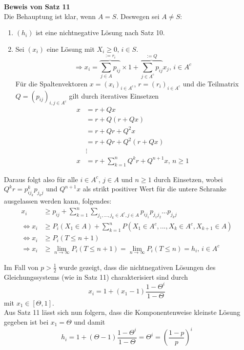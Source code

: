 \documentclass[a4paper,12pt]{article}
\begin{document}
\textbf{Beweis von Satz 11}\\
Die Behauptung ist klar, wenn $A = S$. Deswegen sei $A \neq S$:
\begin{enumerate}
\item $(h_i)$ ist eine nichtnegative Lösung nach Satz 10.
\item Sei $(x_i)$ eine Lösung mit $X_i \geq 0$, $i \in S$.
$$
\Rightarrow x_i = \overbrace{\sum_{j \in A}p_{ij} }^{:= r_i}\times 1 + \overbrace{\sum_{j \in A^c}p_{ij}}^{:= Q}x_j \text{, } i \in A^c
$$
Für die Spaltenvektoren $x = (x_i)_{i \in A^c}$, $r = (r_i)_{i \in A^c}$ und die Teilmatrix $Q = (p_{ij})_{i,j \in A^c}$ gilt
durch iteratives Einsetzen
\begin{align*}
x & = r + Qx\\
& = r + Q(r + Qx)\\
& = r + Qr + Q^2x \\
& = r + Qr + Q^2(r + Qx)\\
& \vdots \\
x & = r + \sum_{k=1}^{n}Q^kr + Q^{n+1}x \text{, } n \geq 1
\end{align*}
\end{enumerate}
Daraus folgt also für alle $i \in A^c$, $j \in A$ und $n \geq 1$ durch Einsetzen, wobei $Q^kr = p_{ij_k}^{k}p_{j_kj}$ und $Q^{n+1}x$ als
strikt positiver Wert für die untere Schranke ausgelassen werden kann, folgendes:
\begin{align*}
x_i & \geq p_{ij} + \sum_{k=1}^{n}\sum_{j_1, ..., j_k \in A^c, j \in A}p_{ij_1}p_{j_1j_2}...p_{j_kj} \\
\Leftrightarrow x_i & \geq P_i(X_1 \in A) + \sum_{k=1}^{n}P(X_1 \in A^c, ..., X_k \in A^c, X_{k+1}\in A)\\
\Leftrightarrow x_i & \geq P_i(T \leq n+1)\\
\Rightarrow x_i & \geq \lim_{n \to \infty}P_i(T \leq n+1) = \lim_{n \to \infty}P_i(T \leq n) = h_i \text{, } i \in A^c
\end{align*}


\begin{tcolorbox}[breakable, colframe=blue, colback=white, title=Beispiel 10 (Fortsetzung)]
Im Fall von $p>\frac{1}{2}$ wurde gezeigt, dass die nichtnegativen Lösungen des Gleichungssystems (wie in Satz 11)
charakterisiert sind durch
$$
x_i = 1 + (x_1 - 1)\frac{1- \Theta^i}{1- \Theta}
$$
mit $x_1 \in [\Theta,1]$.\\
Aus Satz 11 lässt sich nun folgern, dass die Komponentenweise kleinste Lösung gegeben ist bei $x_1 = \Theta$ und damit
$$
h_i = 1+ (\Theta - 1)\frac{1- \Theta^i}{1- \Theta} = \Theta^i = \left(\frac{1-p}{p}\right)^i
$$
\end{tcolorbox}
\end{document}
